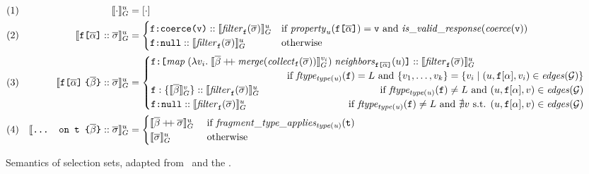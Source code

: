 \begin{figure}[t]
\small
    \centering
    \begin{align*}
    & (1) & \eval{\cdot}{u} &= [\cdot] \\
    & (2) & \evalu{\fld :: \sset} &= \begin{cases}
        \resp{\texttt{coerce(\val)}} :: \evalfilteru{\sset}{\fkey}  
        & \text{if } \mathit{property}_{u}(\fld) = \val \text{ and } \mathit{is\_valid\_response}(\mathit{coerce}(\val)) \\
        \resp{\nval} :: \evalfilteru{\sset}{\fkey} 
        & \text{otherwise}
    \end{cases}\\
    & (3) & \evalu{\nfld{\overline{\beta}} :: \sset} &=
    \begin{cases}
        \resp{\texttt{[} \mathit{map}\; (\lambda v_{i}.\; \eval{\overline{\beta} \mdoubleplus \mathit{merge} (\mathit{collect}_{\fkey} (\sset))}{v_{i}})\; \mathit{neighbors}_{\fld}(u) \texttt{]}} :: \evalfilteru{\sset}{\fkey} \\  
         \hfill \text{ if } 
            \mathit{ftype_{type(u)}(\fkey)} = L \text{ and } \{v_{1}, \ldots, v_{k}\} = 
        \{v_{i} \mid (u, \fkey[\alpha], v_{i}) \in \mathit{edges}(\graph)\} \\
    \fkey:\{\eval{\subqueries{\beta}}{v}\} ::  \evalfilteru{\sset}{\fkey}  
         \hfill \text{ if } 
        \mathit{ftype_{type(u)}(\fkey)}  \neq L \text{ and } (u, \fkey[\alpha], v) \in \mathit{edges}(\graph) \\
    \resp{\nval} :: \evalfilteru{\sset}{\fkey} 
    \qquad \qquad \qquad \qquad \qquad
  \text{ if } \mathit{ftype_{type(u)}(\fkey)}  \neq L  \text{ and } \nexists v \text{ s.t. }  (u, \fkey[\alpha], v) \in \mathit{edges}(\graph) \\
    \end{cases}\\
    & (4) & \evalu{\ifrag{t}{\overline{\beta}} :: \sset} &= 
    \begin{cases}
    \evalu{\overline{\beta} \mdoubleplus \sset} 
     & \text{ if }\mathit{fragment\_type\_applies_{type(u)}(\texttt{t})}\\
    \evalu{\sset} 
    & \text{ otherwise}
    \end{cases}
    \end{align*}
    \caption{Semantics of \gql selection sets, adapted from~\cite{gqlph} and the \spec. 
    \newline {\footnotesize 
}}
\end{figure}
